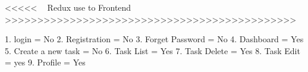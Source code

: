 <<<<< 🐍🐍 Redux use to Frontend >>>>>>>>>>>>>>>>>>>>>>>>>>>>>>>>>>>>>>>>>>>>>

1. login = No
2. Registration = No
3. Forget Password = No
4. Dashboard = Yes
5. Create a new task = No
6. Task List = Yes
7. Task Delete = Yes
8. Task Edit = yes
9. Profile = Yes